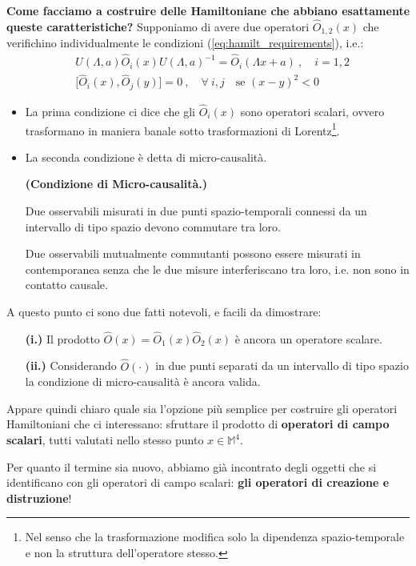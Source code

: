 \documentclass[../main.tex]{subfiles}
\begin{document}
\textbf{Come facciamo a costruire delle Hamiltoniane che abbiano esattamente queste caratteristiche?} Supponiamo di avere due operatori $\hat{O}_{1,2}(x)$ che verifichino individualmente le condizioni (\ref{eq:hamilt_requirements}), i.e.:
\[
\begin{aligned}
    &U(\Lambda, a) \hat{O}_i(x) U(\Lambda, a)^{-1} = \hat{O}_i(\Lambda x + a)~,\quad i=1,2\\
    &\big[\hat{O}_i(x),\hat{O}_j(y)\big] = 0~,\quad \forall~i,j\quad \text{se } (x-y)^2<0 
\end{aligned}
\]
\begin{itemize}
    \item La prima condizione ci dice che gli $\hat{O}_{i}(x)$ sono operatori scalari, ovvero trasformano in maniera banale sotto trasformazioni di Lorentz\footnote{Nel senso che la trasformazione modifica solo la dipendenza spazio-temporale e non la struttura dell'operatore stesso.}.
    \item La seconda condizione è detta di micro-causalità.
    \begin{theorem}
        \textbf{(Condizione di Micro-causalità.)}

        Due osservabili misurati in due punti spazio-temporali connessi da un intervallo di tipo spazio devono commutare tra loro.
        \label{th:microcausality}
    \end{theorem}
    Due osservabili mutualmente commutanti possono essere misurati in contemporanea senza che le due misure interferiscano tra loro, i.e. non sono in contatto causale.
\end{itemize}
A questo punto ci sono due fatti notevoli, e facili da dimostrare:
\begin{enumerate}
    \item[\textbf{(i.)}] Il prodotto $\hat{O}(x) = \hat{O}_{1}(x)\hat{O}_{2}(x)$ è ancora un operatore scalare.
    \item[\textbf{(ii.)}] Considerando $\hat{O}(\cdot)$ in due punti separati da un intervallo di tipo spazio la condizione di micro-causalità è ancora valida.
\end{enumerate}
Appare quindi chiaro quale sia l'opzione più semplice per costruire gli operatori Hamiltoniani che ci interessano: sfruttare il prodotto di \textbf{operatori di campo scalari}, tutti valutati nello stesso punto $x\in\mathbb M^4$.

Per quanto il termine sia nuovo, abbiamo già incontrato degli oggetti che si identificano con gli operatori di campo scalari: \textbf{gli operatori di creazione e distruzione}!
\end{document}
